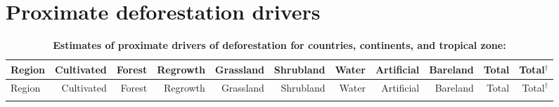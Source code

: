 \chapter{Proximate deforestation drivers}
\label{ch:appendix_c}
	\begin{scriptsize}
	\begin{landscape}
		\begin{center}
			\begin{longtable}[ht]{lrrrrrrrrrr}
			\caption[Estimates of proximate drivers of deforestation for countries, continents, and tropical zone]{\textbf{Estimates of proximate drivers of deforestation for countries, continents, and tropical zone:}} \label{tab:proximate_driver}\\

			\hline
			Region&Cultivated&Forest&Regrowth&Grassland&Shrubland&Water&Artificial&Bareland&Total&Total$^\dagger$\\
			\hline
			\endfirsthead

			\hline
			Region&Cultivated&Forest&Regrowth&Grassland&Shrubland&Water&Artificial&Bareland&Total&Total$^\dagger$\\
			\hline
			\endhead

			\hline
			\endfoot


\end{longtable}
\end{center}
\end{landscape}
\end{scriptsize}
